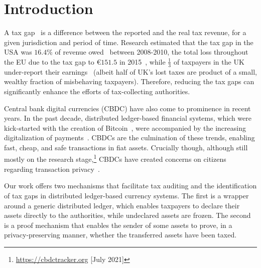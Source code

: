 \section{Introduction}\label{sec:introduction}

A tax gap~\cite{comission2018taxgaps} is a difference between the reported and
the real tax revenue, for a given jurisdiction and period of time. Research
estimated that the tax gap in the USA was $16.4$\% of revenue
owed~\cite{internal2016federal} between 2008-2010, the total loss throughout
the EU due to the tax gap to €$151.5$ in 2015~\cite{murphy2018resources}, while
$\frac{1}{3}$ of taxpayers in the UK under-report their
earnings~\cite{advani2020does} (albeit half of UK's lost taxes are product of a
small, wealthy fraction of misbehaving taxpayers). Therefore, reducing the tax
gaps can significantly enhance the efforts of tax-collecting authorities.

Central bank digital currencies (CBDC) have also come to prominence in recent
years. In the past decade, distributed ledger-based financial systems, which
were kick-started with the creation of Bitcoin~\cite{nakamoto2008bitcoin}, were
accompanied by the increasing digitalization of payments~\cite{bis2011digital}.
CBDCs are the culmination of these trends, enabling fast, cheap, and safe
transactions in fiat assets. Crucially though, although still mostly on the
research stage,\footnote{\url{https://cbdctracker.org} [July 2021]} CBDCs have
created concerns on citizens regarding transaction
privacy~\cite{ecb2021cbdcprivacy}.

Our work offers two mechanisms that facilitate tax auditing and the
identification of tax gaps in distributed ledger-based currency systems. The
first is a wrapper around a generic distributed ledger, which enables taxpayers
to declare their assets directly to the authorities, while undeclared assets
are frozen. The second is a proof mechanism that enables the sender of some
assets to prove, in a privacy-preserving manner, whether the transferred assets
have been taxed.
